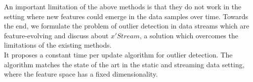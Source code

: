 An important limitation of the above methods is that they do not work in the setting where new features could emerge in the data samples over time. Towards the end, we formulate the problem of outlier detection in data streams which are feature-evolving and discuss about $x'Stream$, a solution which overcomes the limitations of the existing methods. \\

It proposes a constant time per update algorithm for outlier detection. The algorithm matches the state of the art in the static and streaming data setting, where the feature space has a fixed dimensionality.


\appendix

